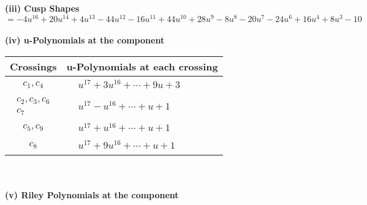 \documentclass[1p]{elsarticle_modified}
\theoremstyle{definition}
\begin{document}
\flushleft \textbf{(iii) Cusp Shapes $= -4 u^{16}+20 u^{14}+4 u^{13}-44 u^{12}-16 u^{11}+44 u^{10}+28 u^9-8 u^8-20 u^7-24 u^6+16 u^4+8 u^3-10$}\\~\\
\newpage\renewcommand{\arraystretch}{1}
\flushleft \textbf{(iv) u-Polynomials at the component}\newline \\
\begin{tabular}{m{50pt}|m{274pt}}
Crossings & \hspace{64pt}u-Polynomials at each crossing \\
\hline $$\begin{aligned}c_{1},c_{4}\end{aligned}$$&$\begin{aligned}
&u^{17}+3 u^{16}+\cdots+9 u+3
\end{aligned}$\\
\hline $$\begin{aligned}c_{2},c_{3},c_{6}\\c_{7}\end{aligned}$$&$\begin{aligned}
&u^{17}- u^{16}+\cdots+u+1
\end{aligned}$\\
\hline $$\begin{aligned}c_{5},c_{9}\end{aligned}$$&$\begin{aligned}
&u^{17}+u^{16}+\cdots+u+1
\end{aligned}$\\
\hline $$\begin{aligned}c_{8}\end{aligned}$$&$\begin{aligned}
&u^{17}+9 u^{16}+\cdots+u+1
\end{aligned}$\\
\hline
\end{tabular}\\~\\
\newpage\renewcommand{\arraystretch}{1}
\flushleft \textbf{(v) Riley Polynomials at the component}\newline \\
\end{document}
